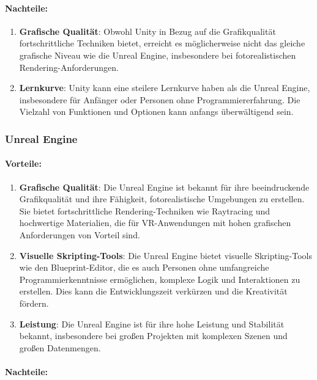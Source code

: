 \paragraph{Nachteile:}

\begin{enumerate}
\item \textbf{Grafische Qualität}: Obwohl Unity in Bezug auf die Grafikqualität fortschrittliche Techniken bietet, erreicht es möglicherweise nicht das gleiche grafische Niveau wie die Unreal Engine, insbesondere bei fotorealistischen Rendering-Anforderungen.
\item \textbf{Lernkurve}: Unity kann eine steilere Lernkurve haben als die Unreal Engine, insbesondere für Anfänger oder Personen ohne Programmiererfahrung. Die Vielzahl von Funktionen und Optionen kann anfangs überwältigend sein.
\end{enumerate}

\subsubsection{Unreal Engine}

\paragraph{Vorteile:}

\begin{enumerate}
\item \textbf{Grafische Qualität}: Die Unreal Engine ist bekannt für ihre beeindruckende Grafikqualität und ihre Fähigkeit, fotorealistische Umgebungen zu erstellen. Sie bietet fortschrittliche Rendering-Techniken wie Raytracing und hochwertige Materialien, die für VR-Anwendungen mit hohen grafischen Anforderungen von Vorteil sind.
\item \textbf{Visuelle Skripting-Tools}: Die Unreal Engine bietet visuelle Skripting-Tools wie den Blueprint-Editor, die es auch Personen ohne umfangreiche Programmierkenntnisse ermöglichen, komplexe Logik und Interaktionen zu erstellen. Dies kann die Entwicklungszeit verkürzen und die Kreativität fördern.

\item \textbf{Leistung}: Die Unreal Engine ist für ihre hohe Leistung und Stabilität bekannt, insbesondere bei großen Projekten mit komplexen Szenen und großen Datenmengen.
\end{enumerate}

\paragraph{Nachteile:}

